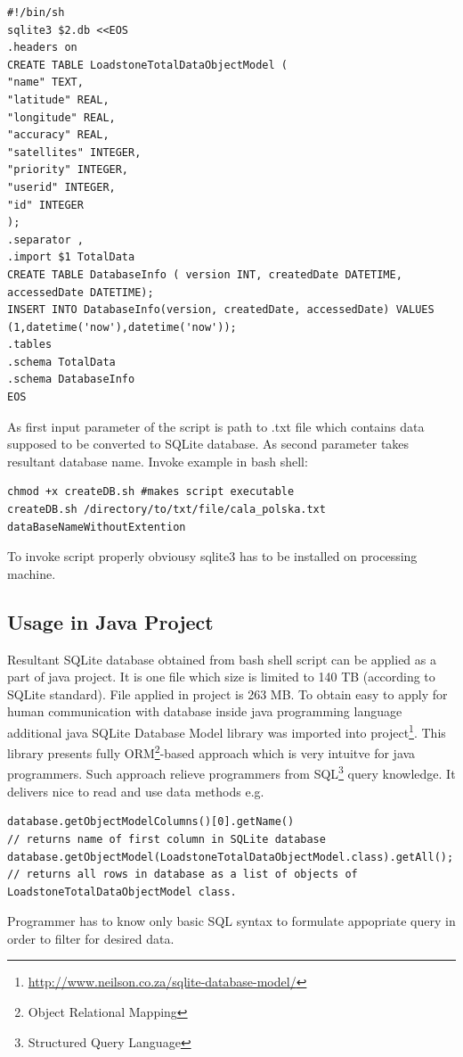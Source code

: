 \begin{lstlisting}[style=BASH]	
#!/bin/sh
sqlite3 $2.db <<EOS
.headers on
CREATE TABLE LoadstoneTotalDataObjectModel (
"name" TEXT,
"latitude" REAL,
"longitude" REAL,
"accuracy" REAL,
"satellites" INTEGER,
"priority" INTEGER,
"userid" INTEGER,
"id" INTEGER
);
.separator ,
.import $1 TotalData
CREATE TABLE DatabaseInfo ( version INT, createdDate DATETIME, accessedDate DATETIME);
INSERT INTO DatabaseInfo(version, createdDate, accessedDate) VALUES (1,datetime('now'),datetime('now'));
.tables
.schema TotalData
.schema DatabaseInfo
EOS
\end{lstlisting}

As first input parameter of the script is path to .txt file which contains data supposed to be converted to SQLite database. As second parameter takes resultant database name. Invoke example in bash shell:
\begin{lstlisting}[style=BASH]
chmod +x createDB.sh #makes script executable
createDB.sh /directory/to/txt/file/cala_polska.txt dataBaseNameWithoutExtention
\end{lstlisting}
To invoke script properly obviousy sqlite3 has to be installed on processing machine. 

\subsection{Usage in Java Project}
Resultant SQLite database obtained from bash shell script can be applied as a part of java project. It is one file which size is limited to 140 TB (according to SQLite standard). File applied in project is 263 MB. To obtain easy to apply for human communication with database inside java programming language additional java SQLite Database Model library was imported into project\footnote{\url{http://www.neilson.co.za/sqlite-database-model/}}. This library presents fully ORM\footnote{Object Relational Mapping}-based approach which is very intuitve for java programmers. Such approach relieve programmers from SQL\footnote{Structured Query Language} query knowledge. It delivers nice to read and use data methods e.g.
\begin{lstlisting}[style=JAVA]
database.getObjectModelColumns()[0].getName()
// returns name of first column in SQLite database
database.getObjectModel(LoadstoneTotalDataObjectModel.class).getAll();
// returns all rows in database as a list of objects of LoadstoneTotalDataObjectModel class.
\end{lstlisting}
Programmer has to know only basic SQL syntax to formulate appopriate query in order to filter for desired data.
